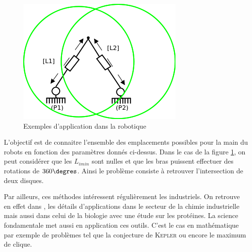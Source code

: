 \begin{figure}[h] %
  \center
\includegraphics[scale=0.80]{img/robot2}
  \caption{Exemples d'application dans la robotique} %
 \label{fig:rob} %
\end{figure} %
L'objectif est de connaitre l'ensemble des emplacements possibles pour la main du robots en fonction des paramètres donnés ci-dessus. Dans le cas de la figure \ref{fig:rob}, on peut considérer que les $L_{imin}$ sont nulles et que les bras puissent effectuer des rotations de $360 \degres$. Ainsi le problème consiste à retrouver l'intersection de deux disques. 

  Par ailleurs, ces méthodes intéressent régulièrement les industriels. On retrouve en effet dans \cite{Schichl}, les détails d'applications dans le secteur de la chimie industrielle mais aussi dans celui de la biologie avec une étude sur les protéines. La science fondamentale met aussi en application ces outils. C'est le cas en mathématique par exemple de problèmes tel que la conjecture de \textsc{Kepler} ou encore le  maximum de clique.

\clearpage
